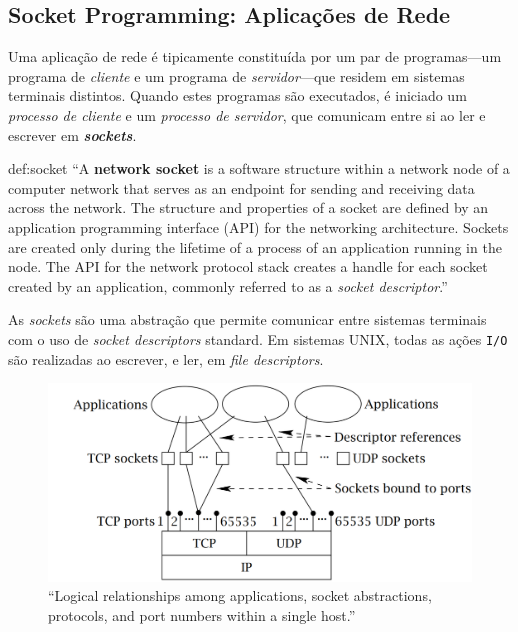 \subsection[2.5 Socket Programming: Aplicações de Rede]{\hspace*{0.075 em}\raisebox{0.2 em}{$\pmb{\drsh}$} Socket Programming: Aplicações de Rede}
\label{subsec:socket-programming}

Uma aplicação de rede é tipicamente constituída por um par de programas---um programa de \textit{cliente} e um programa de \textit{servidor}---que residem em sistemas terminais distintos. Quando estes programas são executados, é iniciado um \textit{processo de cliente} e um \textit{processo de servidor}, que comunicam entre si ao ler e escrever em \textbf{\textit{sockets}}.

\begin{theo}{def:socket}\label{def:socket}
    {\footnotesize
        ``A \textbf{network socket} is a software structure within a network node of a computer network that serves as an endpoint for sending and receiving data across the network. The structure and properties of a socket are defined by an application programming interface (API) for the networking architecture. Sockets are created only during the lifetime of a process of an application running in the node. The API for the network protocol stack creates a handle for each socket created by an application, commonly referred to as a \textit{socket descriptor}.''
    }

    \vspace{0.75em}
    \noindent As \textit{sockets} são uma abstração que permite comunicar entre sistemas terminais com o uso de \textit{socket descriptors} standard. Em sistemas UNIX, todas as ações \texttt{I/O} são realizadas ao escrever, e ler, em \textit{file descriptors}.
\end{theo}

\begin{figure}[H]
    \centering
    \includegraphics[width = 0.75\linewidth]{img/2/app-sockets-protocols.png}
    \caption{``Logical relationships among applications, socket abstractions, protocols, and port numbers within a single host.''\protect\cite{Donahoo-Kenneth2002}}
    \label{fig:app-sockets-protocols}
\end{figure}

